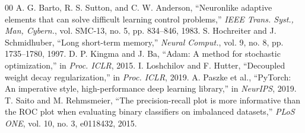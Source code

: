 \documentclass[conference]{IEEEtran}
\begin{document}
\begin{thebibliography}{00}
 A. G. Barto, R. S. Sutton, and C. W. Anderson, ``Neuronlike adaptive elements that can solve difficult learning control problems,'' \emph{IEEE Trans. Syst., Man, Cybern.}, vol. SMC-13, no. 5, pp. 834--846, 1983.
 S. Hochreiter and J. Schmidhuber, ``Long short-term memory,'' \emph{Neural Comput.}, vol. 9, no. 8, pp. 1735--1780, 1997.
 D. P. Kingma and J. Ba, ``Adam: A method for stochastic optimization,'' in \emph{Proc. ICLR}, 2015.
 I. Loshchilov and F. Hutter, ``Decoupled weight decay regularization,'' in \emph{Proc. ICLR}, 2019.
 A. Paszke et al., ``PyTorch: An imperative style, high-performance deep learning library,'' in \emph{NeurIPS}, 2019.
 T. Saito and M. Rehmsmeier, ``The precision-recall plot is more informative than the ROC plot when evaluating binary classifiers on imbalanced datasets,'' \emph{PLoS ONE}, vol. 10, no. 3, e0118432, 2015.
\end{thebibliography}
\end{document}
